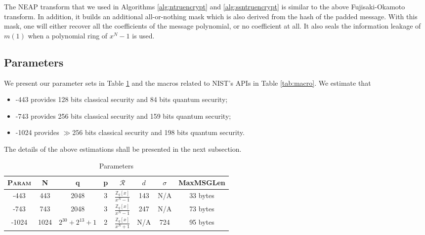 \documentclass{llncs}
\newcommand{\ZZ}{\mathbb{Z}}
\newcommand{\ntru}{{\sf{NTRU}}}
\newcommand{\<}{\langle}
\renewcommand{\>}{\rangle}
\begin{document}
The NEAP \cite{DBLP:conf/ctrsa/Howgrave-GrahamSW05} transform that we
used in Algorithms \ref{alg:ntruencrypt} and \ref{alg:ssntruencrypt} is 
similar to the above Fujisaki-Okamoto transform. In addition, it builds 
an additional all-or-nothing mask which is also derived from the hash
of the padded message. With this mask, one will either recover all the 
coefficients of the message polynomial, or no coefficient at all. It
also seals the information leakage of $m(1)$ when a polynomial ring of
$x^N-1$ is used.
\subsection{Parameters}


We present our parameter sets in Table \ref{tab:param} and the macros related  to NIST's APIs in Table \ref{tab:macro}.
We estimate that 
\begin{itemize}
\item \ntru-443 provides 128 bits classical security
and 84 bits quantum security;
\item \ntru-743 provides 256 bits classical security
and 159 bits quantum security;
\item \ntru-1024 provides $\gg$256 bits classical security
and 198 bits quantum security.
\end{itemize}
The details of the above estimations shall be presented in the next subsection.
\begin{table}
\centering
\caption{Parameters}
\label{tab:param}
\begin{tabular}{|c|c|c|c|c|c|c|c|}\hline
\textsc{Param} &N & q & p &$\mathcal{R}$ & $d$ & $\sigma$ & MaxMSGLen\\\hline\hline
\ntru-443&443 & 2048 & 3 & $\frac{\ZZ_q[x]}{x^N-1}$ & 143 & N/A & 33 bytes\\%
\ntru-743&743 & 2048 & 3 & $\frac{\ZZ_q[x]}{x^N-1}$ & 247 & N/A & 73 bytes\\%
\ntru-1024&1024 & $2^{30}+2^{13}+1$ & 2 & $\frac{\ZZ_q[x]}{x^N+1}$ & N/A & 724 & 95 bytes\\\hline
\end{tabular}
\end{table}
\end{document}

